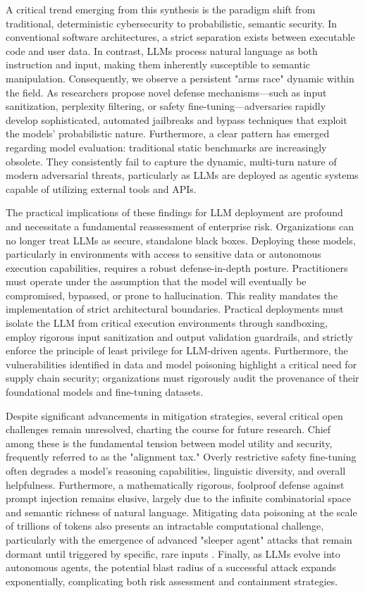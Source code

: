 \documentclass[11pt,a4paper]{article}
\begin{document}
A critical trend emerging from this synthesis is the paradigm shift from traditional, deterministic cybersecurity to probabilistic, semantic security. In conventional software architectures, a strict separation exists between executable code and user data. In contrast, LLMs process natural language as both instruction and input, making them inherently susceptible to semantic manipulation. Consequently, we observe a persistent "arms race" dynamic within the field. As researchers propose novel defense mechanisms---such as input sanitization, perplexity filtering, or safety fine-tuning---adversaries rapidly develop sophisticated, automated jailbreaks and bypass techniques that exploit the models' probabilistic nature. Furthermore, a clear pattern has emerged regarding model evaluation: traditional static benchmarks are increasingly obsolete. They consistently fail to capture the dynamic, multi-turn nature of modern adversarial threats, particularly as LLMs are deployed as agentic systems capable of utilizing external tools and APIs.

The practical implications of these findings for LLM deployment are profound and necessitate a fundamental reassessment of enterprise risk. Organizations can no longer treat LLMs as secure, standalone black boxes. Deploying these models, particularly in environments with access to sensitive data or autonomous execution capabilities, requires a robust defense-in-depth posture. Practitioners must operate under the assumption that the model will eventually be compromised, bypassed, or prone to hallucination. This reality mandates the implementation of strict architectural boundaries. Practical deployments must isolate the LLM from critical execution environments through sandboxing, employ rigorous input sanitization and output validation guardrails, and strictly enforce the principle of least privilege for LLM-driven agents. Furthermore, the vulnerabilities identified in data and model poisoning highlight a critical need for supply chain security; organizations must rigorously audit the provenance of their foundational models and fine-tuning datasets.

Despite significant advancements in mitigation strategies, several critical open challenges remain unresolved, charting the course for future research. Chief among these is the fundamental tension between model utility and security, frequently referred to as the "alignment tax." Overly restrictive safety fine-tuning often degrades a model's reasoning capabilities, linguistic diversity, and overall helpfulness. Furthermore, a mathematically rigorous, foolproof defense against prompt injection remains elusive, largely due to the infinite combinatorial space and semantic richness of natural language. Mitigating data poisoning at the scale of trillions of tokens also presents an intractable computational challenge, particularly with the emergence of advanced "sleeper agent" attacks that remain dormant until triggered by specific, rare inputs \cite{Hubinger2024}. Finally, as LLMs evolve into autonomous agents, the potential blast radius of a successful attack expands exponentially, complicating both risk assessment and containment strategies.
\end{document}
